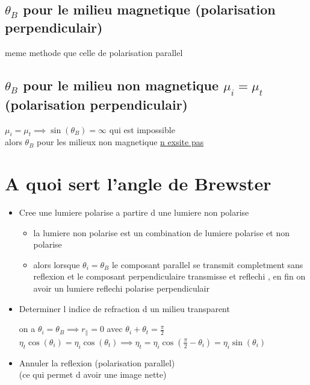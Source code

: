 \documentclass[12pt]{book}
\begin{document}
            \subsection{$\theta_B$ pour le milieu magnetique (polarisation perpendiculair)}
            meme methode que celle de polarisation parallel
            \begin{center}
            \end{center}
            \subsection{$\theta_B$ pour le milieu non magnetique $\mu_i = \mu_t$ (polarisation perpendiculair)}
            $\mu_i = \mu_t \implies \sin(\theta_B) = \infty$ qui est impossible \\
            alors $\theta_B$ pour les milieux non magnetique \underline{n exsite pas}
        \section{A quoi sert l'angle de Brewster}
        \begin{itemize}
            \item Cree une lumiere polarise a partire d une lumiere non polarise 
                \begin{center}
                    \begin{itemize}
                        \item la lumiere non polarise est un combination de lumiere polarise et non polarise 
                        \item alors lorsque $\theta_i = \theta_B$ le composant parallel se transmit completment sans reflexion et le composant perpendiculaire transmisse et reflechi , en fin on avoir un lumiere reflechi polarise perpendiculair
                    \end{itemize}
                \end{center}
            \item Determiner l indice de refraction d un milieu transparent 
                \begin{center}
                    on a $\theta_i = \theta_B \implies r_\parallel = 0 $ avec $\theta_i + \theta_t = \frac{\pi}{2}$ \\
                    $\eta_t\cos(\theta_i) =\eta_i\cos(\theta_t) \implies \eta_t = \eta_i\cos(\frac{\pi}{2} - \theta_i) = \eta_i\sin(\theta_i)$ \\
                \end{center}
            \item  Annuler la reflexion (polarisation parallel)\\
                    (ce qui permet d avoir une image nette)
        \end{itemize}
        
\end{document}
